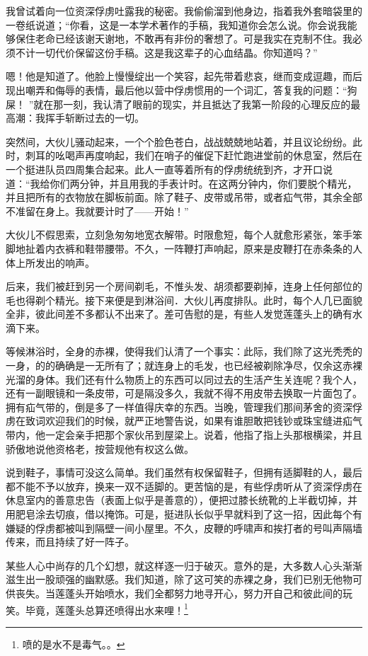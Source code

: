 \documentclass[11pt,oneside]{book}
\begin{document}
\begin{common-format}
我曾试着向一位资深俘虏吐露我的秘密。我偷偷溜到他身边，指着我外套暗袋里的一卷纸说道；“你看，这是一本学术著作的手稿，我知道你会怎么说。你会说我能够保住老命已经该谢天谢地，不敢再有非份的奢想了。可是我实在克制不住。我必须不计一切代价保留这份手稿。这是我这辈子的心血结晶。你知道吗？”

嗯！他是知道了。他脸上慢慢绽出一个笑容，起先带着悲哀，继而变成逗趣，而后现出嘲弄和侮辱的表情，最后他以营中俘虏惯用的一个词汇，答复我的问题：“狗屎！ ”就在那一刻，我认清了眼前的现实，并且抵达了我第一阶段的心理反应的最高潮：我挥手斩断过去的一切。

突然间，大伙儿骚动起来，一个个脸色苍白，战战兢兢地站着，并且议论纷纷。此时，刺耳的吆喝声再度响起，我们在哨子的催促下赶忙跑进堂前的休息室，然后在一个挺进队员四周集合起来。此人一直等着所有的俘虏统统到齐，才开口说道：“我给你们两分钟，并且用我的手表计时。在这两分钟内，你们要脱个精光，并且把所有的衣物放在脚板前面。除了鞋子、皮带或吊带，或者疝气带，其余全部不准留在身上。我就要计时了——开始！”

大伙儿不假思索，立刻急匆匆地宽衣解带。时限愈短，每个人就愈形紧张，笨手笨脚地扯着内衣裤和鞋带腰带。不久，一阵鞭打声响起，原来是皮鞭打在赤条条的人体上所发出的响声。

后来，我们被赶到另一个房间剃毛，不惟头发、胡须都要剃掉，连身上任何部位的毛也得剃个精光。接下来便是到淋浴间．大伙儿再度排队。此时，每个人几已面貌全非，彼此间差不多都认不出来了。差可告慰的是，有些人发觉莲蓬头上的确有水滴下来。

等候淋浴时，全身的赤裸，使得我们认清了一个事实：此际，我们除了这光秃秃的一身，的的确确是一无所有了；就连身上的毛发，也已经被剃除净尽，仅余这赤裸光溜的身体。我们还有什么物质上的东西可以同过去的生活产生关连呢？我个人，还有一副眼镜和一条皮带，可是隔没多久，我就不得不用皮带去换取一片面包了。拥有疝气带的，倒是多了一样值得庆幸的东西。当晚，管理我们那间茅舍的资深俘虏在致词欢迎我们的时候，就严正地警告说，如果有谁胆敢把钱钞或珠宝缝进疝气带内，他一定会亲手把那个家伙吊到屋梁上。说着，他指了指上头那根横梁，并且骄傲地说他资格老，按营规他有权这么做。

说到鞋子，事情可没这么简单。我们虽然有权保留鞋子，但拥有适脚鞋的人，最后都不能不予以放弃，换来一双不适脚的。更苦恼的是，有些俘虏听从了资深俘虏在休息室内的善意忠告（表面上似乎是善意的），便把过膝长统靴的上半截切掉，并用肥皂涂去切痕，借以掩饰。可是，挺进队长似乎早就料到了这一招，因此每个有嫌疑的俘虏都被叫到隔壁一间小屋里。不久，皮鞭的呼啸声和挨打者的号叫声隔墙传来，而且持续了好一阵子。

某些人心中尚存的几个幻想，就这样逐一归于破灭。意外的是，大多数人心头渐渐滋生出一股顽强的幽默感。我们知道，除了这可笑的赤裸之身，我们已别无他物可供丧失。当莲蓬头开始喷水，我们全都努力地寻开心，努力开自己和彼此间的玩笑。毕竟，莲蓬头总算还喷得出水来哩！\footnote{喷的是水不是毒气。。}


\end{common-format}
\end{document}
